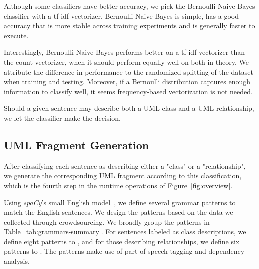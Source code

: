 \documentclass[sigconf]{acmart}
\begin{document}
Although some classifiers have better accuracy, we pick the Bernoulli Naive Bayes classifier with a tf-idf vectorizer. Bernoulli Naive Bayes is simple, has a good accuracy that is more stable across training experiments and is generally faster to execute.

Interestingly, Bernoulli Naive Bayes performs better on a tf-idf vectorizer than the count vectorizer, when it should perform equally well on both in theory. We attribute the difference in performance to the randomized splitting of the dataset when training and testing. Moreover, if a Bernoulli distribution captures enough information to classify well, it seems frequency-based vectorization is not needed.

Should a given sentence may describe both a UML class and a UML relationship, we let the classifier make the decision.

\subsection{UML Fragment Generation} \label{sec:generation}
After classifying each sentence as describing either a "class" or a "relationship", we generate the corresponding UML fragment according to this classification, which is the fourth step in the runtime operations of Figure~\ref{fig:overview}.

Using \textit{spaCy}'s small English model~\cite{spacy}, we define several grammar patterns to match the English sentences. We design the patterns based on the data we collected through crowdsourcing. We broadly group the patterns in Table~\ref{tab:grammars-summary}. For sentences labeled as class descriptions, we define eight patterns  to , and for those describing relationships, we define six patterns  to . The patterns make use of part-of-speech tagging and dependency analysis.
\end{document}
